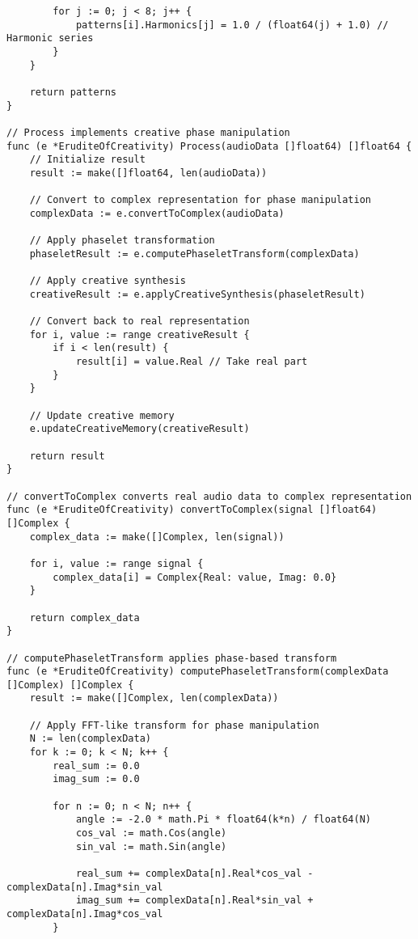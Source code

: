 \begin{tcolorbox}[colback=CodeBackground, colframe=DarkGray, title=Erudite of Creativity Implementation, fonttitle=\bfseries]
\begin{verbatim}
        for j := 0; j < 8; j++ {
            patterns[i].Harmonics[j] = 1.0 / (float64(j) + 1.0) // Harmonic series
        }
    }
    
    return patterns
}

// Process implements creative phase manipulation
func (e *EruditeOfCreativity) Process(audioData []float64) []float64 {
    // Initialize result
    result := make([]float64, len(audioData))
    
    // Convert to complex representation for phase manipulation
    complexData := e.convertToComplex(audioData)
    
    // Apply phaselet transformation
    phaseletResult := e.computePhaseletTransform(complexData)
    
    // Apply creative synthesis
    creativeResult := e.applyCreativeSynthesis(phaseletResult)
    
    // Convert back to real representation
    for i, value := range creativeResult {
        if i < len(result) {
            result[i] = value.Real // Take real part
        }
    }
    
    // Update creative memory
    e.updateCreativeMemory(creativeResult)
    
    return result
}

// convertToComplex converts real audio data to complex representation
func (e *EruditeOfCreativity) convertToComplex(signal []float64) []Complex {
    complex_data := make([]Complex, len(signal))
    
    for i, value := range signal {
        complex_data[i] = Complex{Real: value, Imag: 0.0}
    }
    
    return complex_data
}

// computePhaseletTransform applies phase-based transform
func (e *EruditeOfCreativity) computePhaseletTransform(complexData []Complex) []Complex {
    result := make([]Complex, len(complexData))
    
    // Apply FFT-like transform for phase manipulation
    N := len(complexData)
    for k := 0; k < N; k++ {
        real_sum := 0.0
        imag_sum := 0.0
        
        for n := 0; n < N; n++ {
            angle := -2.0 * math.Pi * float64(k*n) / float64(N)
            cos_val := math.Cos(angle)
            sin_val := math.Sin(angle)
            
            real_sum += complexData[n].Real*cos_val - complexData[n].Imag*sin_val
            imag_sum += complexData[n].Real*sin_val + complexData[n].Imag*cos_val
        }
        

\end{verbatim}
\end{tcolorbox}
